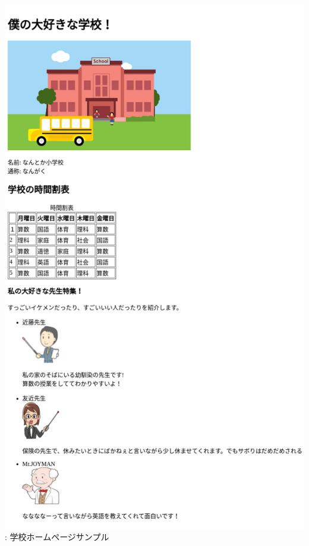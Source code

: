 \documentclass[a4paper,12pt]{jarticle}
\begin{document}
\begin{minipage}{0.45\textwidth}
  {\upshape
    \includegraphics[width=0.9\linewidth]{textbook-img210.png}
    \newline
    {\theFigure\label{seq:refFigure44}}:
    学校ホームページサンプル}
\end{minipage}
\end{document}
